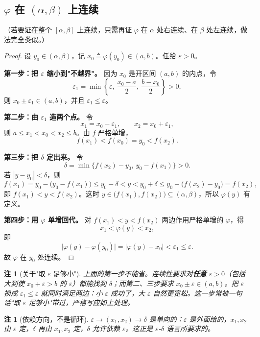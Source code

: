 \documentclass[UTF8,11pt]{ctexart}
\theoremstyle{cnthm}
\newtheorem{rem}[thm]{注}
\begin{document}
\subsection{$\varphi$ 在 $(\alpha,\beta)$ 上连续}

（若要证在整个 $[\alpha,\beta]$ 上连续，只需再证 $\varphi$ 在 $\alpha$ 处右连续、在 $\beta$ 处左连续，做法完全类似。）

\begin{proof}
设 $y_0\in(\alpha,\beta)$，记 $x_0\triangleq\varphi(y_0)\in(a,b)$。任给 $\varepsilon>0$。

\textbf{第一步：把 $\varepsilon$ 缩小到"不越界"。} 因为 $x_0$ 是开区间 $(a,b)$ 的内点，令
\[
\varepsilon_1=\min\left\{\varepsilon,\ \frac{x_0-a}{2},\ \frac{b-x_0}{2}\right\}>0 ,
\]
则 $x_0\pm\varepsilon_1\in(a,b)$，并且 $\varepsilon_1\leq\varepsilon$。

\textbf{第二步：由 $\varepsilon_1$ 造两个点。} 令
\[
x_1=x_0-\varepsilon_1,\qquad x_2=x_0+\varepsilon_1 ,
\]
则 $a\leq x_1<x_0<x_2\leq b$。由 $f$ 严格单增，
\[
f(x_1)<f(x_0)=y_0<f(x_2).
\]

\textbf{第三步：把 $\delta$ 定出来。} 令
\[
\delta=\min\bigl\{f(x_2)-y_0,\ y_0-f(x_1)\bigr\}>0 .
\]
若 $|y-y_0|<\delta$，则
\[
f(x_1)=y_0-\bigl(y_0-f(x_1)\bigr)\leq y_0-\delta<y<y_0+\delta\leq y_0+\bigl(f(x_2)-y_0\bigr)=f(x_2),
\]
即 $f(x_1)<y<f(x_2)$。这时 $y\in\bigl(f(x_1),f(x_2)\bigr)\subseteq(\alpha,\beta)$，所以 $\varphi(y)$ 有定义。

\textbf{第四步：用 $\varphi$ 单增回代。} 对 $f(x_1)<y<f(x_2)$ 两边作用严格单增的 $\varphi$，得
\[
x_1<\varphi(y)<x_2 ,
\]
即
\[
\bigl|\varphi(y)-\varphi(y_0)\bigr|=\bigl|\varphi(y)-x_0\bigr|<\varepsilon_1\leq\varepsilon .
\]
故 $\varphi$ 在 $y_0$ 处连续。
\end{proof}

\begin{rem}[关于"取 $\varepsilon$ 足够小"]
上面的第一步不能省。连续性要求对\textbf{任意} $\varepsilon>0$（包括大到使 $x_0+\varepsilon>b$ 的 $\varepsilon$）都能找到 $\delta$；而第二、三步要求 $x_0\pm\varepsilon\in(a,b)$。把 $\varepsilon$ 换成 $\varepsilon_1\leq\varepsilon$ 就同时满足两边：小 $\varepsilon$ 成功了，大 $\varepsilon$ 自然更宽松。这一步常被一句话"取 $\varepsilon$ 足够小"带过，严格写应如上处理。
\end{rem}

\begin{rem}[依赖方向，不是循环]
$\varepsilon\longrightarrow(x_1,x_2)\longrightarrow\delta$ 是单向的：$\varepsilon$ 是外面给的，$x_1,x_2$ 由 $\varepsilon$ 定，$\delta$ 再由 $x_1,x_2$ 定，$\delta$ 允许依赖 $\varepsilon$。这正是 $\varepsilon$-$\delta$ 语言所要求的。
\end{rem}
\end{document}
